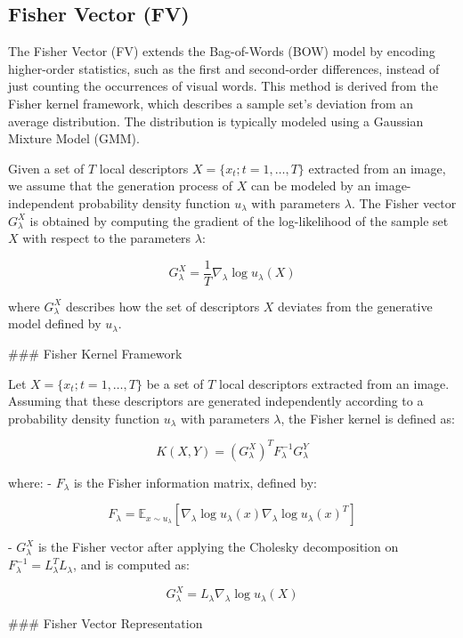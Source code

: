 \subsection{Fisher Vector (FV)}

The Fisher Vector (FV) extends the Bag-of-Words (BOW) model by encoding higher-order statistics, such as the first and second-order differences, instead of just counting the occurrences of visual words. This method is derived from the Fisher kernel framework, which describes a sample set's deviation from an average distribution. The distribution is typically modeled using a Gaussian Mixture Model (GMM).

Given a set of \(T\) local descriptors \(X = \{x_t; t = 1, \ldots, T\}\) extracted from an image, we assume that the generation process of \(X\) can be modeled by an image-independent probability density function \(u_{\lambda}\) with parameters \(\lambda\). The Fisher vector \(G^{X}_{\lambda}\) is obtained by computing the gradient of the log-likelihood of the sample set \(X\) with respect to the parameters \(\lambda\):

\[
G^{X}_{\lambda} = \frac{1}{T} \nabla_{\lambda} \log u_{\lambda}(X)
\]

where \(G^{X}_{\lambda}\) describes how the set of descriptors \(X\) deviates from the generative model defined by \(u_{\lambda}\).

### Fisher Kernel Framework

Let \(X = \{x_t; t = 1, \ldots, T\}\) be a set of \(T\) local descriptors extracted from an image. Assuming that these descriptors are generated independently according to a probability density function \(u_{\lambda}\) with parameters \(\lambda\), the Fisher kernel is defined as:

\[
K(X, Y) = (G^{X}_{\lambda})^T F_{\lambda}^{-1} G^{Y}_{\lambda}
\]

where:
- \(F_{\lambda}\) is the Fisher information matrix, defined by:

\[
F_{\lambda} = \mathbb{E}_{x \sim u_{\lambda}} \left[ \nabla_{\lambda} \log u_{\lambda}(x) \nabla_{\lambda} \log u_{\lambda}(x)^T \right]
\]

- \(G^{X}_{\lambda}\) is the Fisher vector after applying the Cholesky decomposition on \(F_{\lambda}^{-1} = L_{\lambda}^T L_{\lambda}\), and is computed as:

\[
G^{X}_{\lambda} = L_{\lambda} \nabla_{\lambda} \log u_{\lambda}(X)
\]

### Fisher Vector Representation

